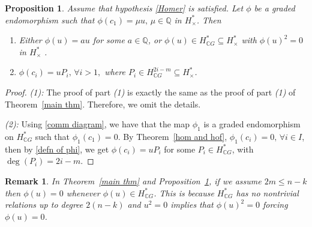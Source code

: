 \documentclass{amsart}
\newtheorem{proposition}[theorem]{Proposition}
\newtheorem{remark}[theorem]{Remark}
\newcommand{\thmref}[1]{Theorem~\ref{#1}}
\newcommand{\propref}[1]{Proposition~\ref{#1}}
\begin{document}
	
	\begin{proposition}\label{main thm 2}
		Assume %
that hypothesis \eqref{Homer} is satisfied.
		Let $\phi$ be a graded endomorphism such that $\phi(c_1)=\mu u,\, \mu \in \mathbb{Q}$ in $H^*_{\times}$. %
Then
		\begin{enumerate}
			\item Either $\phi(u)=a u$ for some $a \in \mathbb{Q}$, or $\phi(u) \in H^*_{\mathbb{C}G} \subseteq H^*_{\times}$ with $\phi(u)^2=0$ in $H^*_{\times}$%
.
			\item  $\phi(c_i) = uP_i, \, \forall i >1,$ where $P_i \in H^{2i-m}_{\mathbb CG}\subseteq H^*_\times$. 
		\end{enumerate}
	\end{proposition}
	\begin{proof} \textit{(1):} The %
proof of %
part \textit{(1)} is %
exactly the same as the proof of %
part \textit{(1)} of %
\thmref{main thm}. Therefore, we omit the %
details.
		
		\textit{(2):} Using %
\eqref{comm diagram}, we have that the map $\phi_1$ is a graded endomorphism on $H^*_{\mathbb{C}G}$ such that $\phi_1(c_1) =0$. By \thmref{hom and hof}, $\phi_1(c_i) =0, \, \forall i\in I$, then by \eqref{defn of phi}, we get $\phi(c_i) = uP_i$ for some $P_i \in H^*_{\mathbb{C}G}$, with $\deg(P_i) = 2i - m$. \end{proof}
	\begin{remark}
		In \thmref{main thm} and \propref{main thm 2}, if we assume $2m \leq n-k$  then $\phi(u)=0$ whenever $\phi(u) \in H^*_{\mathbb{C}G}$. This is because $H^*_{\mathbb{C}G}$ has no nontrivial relations up to degree $2(n-k)$ and $u^2=0$ implies that $\phi(u)^2=0$ forcing $\phi(u)=0$.
		
	\end{remark}
\end{document}
